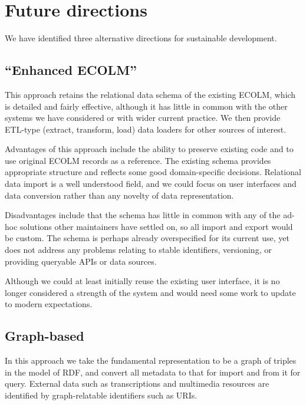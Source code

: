 \documentclass[sigconf]{acmart}
\begin{document}
\begin{sloppypar}
  \section{Future directions}

  We have identified three alternative directions for sustainable
  development.
  
  \subsection{``Enhanced ECOLM''}

  This approach retains the relational data schema of the existing
  ECOLM, which is detailed and fairly effective, although it has
  little in common with the other systems we have considered or with
  wider current practice. We then provide ETL-type (extract,
  transform, load) data loaders for other sources of interest.

  Advantages of this approach include the ability to preserve existing
  code and to use original ECOLM records as a reference. The existing
  schema provides appropriate structure and reflects some good
  domain-specific decisions. Relational data import is a well
  understood field, and we could focus on user interfaces and data
  conversion rather than any novelty of data representation.

  Disadvantages include that the schema has little in common with any
  of the ad-hoc solutions other maintainers have settled on, so all
  import and export would be custom. The schema is perhaps already
  overspecified for its current use, yet does not address any problems
  relating to stable identifiers, versioning, or providing queryable
  APIs or data sources.

  Although we could at least initially reuse the existing user
  interface, it is no longer considered a strength of the system and
  would need some work to update to modern expectations.

  \subsection{Graph-based}

  In this approach we take the fundamental representation to be a
  graph of triples in the model of RDF, and convert all metadata to
  that for import and from it for query. External data such as
  transcriptions and multimedia resources are identified by
  graph-relatable identifiers such as URIs.


\end{sloppypar}
\end{document}
